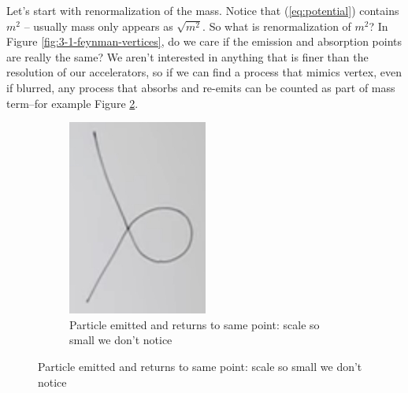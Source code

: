 \documentclass[]{article}
\begin{document}
Let's start with renormalization of the mass. Notice that (\ref{eq:potential}) contains $m^2$ -- usually mass only appears as $\sqrt{m^2}$. So what is renormalization of $m^2$? In Figure \ref{fig:3-1-feynman-vertices}, do we care if the emission and absorption points are really the same? We aren't interested in anything that is finer than the resolution of our accelerators, so if we can find a process that mimics vertex,  even if blurred, any process that absorbs and re-emits can be counted as part of mass term--for example Figure \ref{fig:3-1-feynman-mimic}.


\begin{figure}[H]
	\caption{Mimicking the Vertex}
	\begin{subfigure}[t]{0.3\textwidth}
		\caption{Particle emitted and returns to same point: scale so small we don't notice}\label{fig:3-1-feynman-mimic}
		\includegraphics[width=\textwidth]{3-1-feynman-mimic}

\end{subfigure}
\end{figure}
\end{document}

